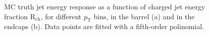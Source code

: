 \documentclass{cmspaper}
\begin{document}





\begin{figure}[tb]
\centering
{}
\caption{MC truth jet energy response as a function of charged jet energy fraction R$_{\mathrm{ch}}$, for different $p_{\mathrm{T}}$ bins, in the barrel (a) and in the endcaps (b). Data points are fitted with a fifth-order polinomial. \label{fig:Rchfits}}
\end{figure}
\end{document}
